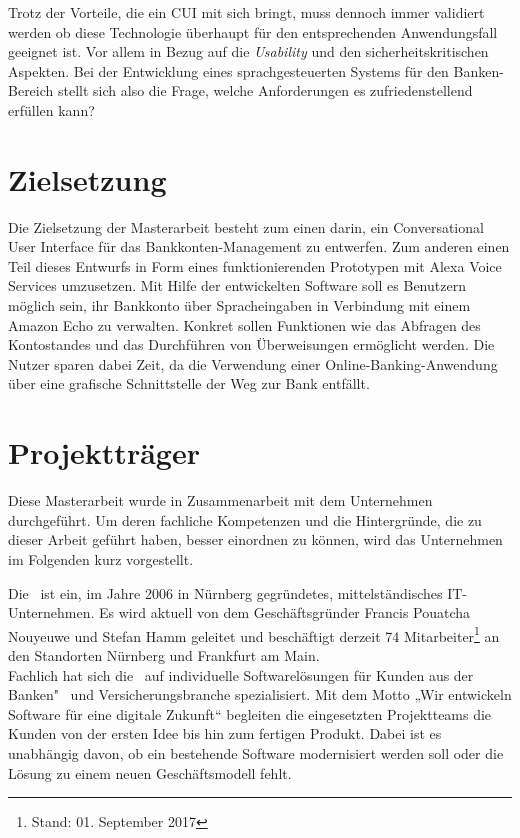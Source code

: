 Trotz der Vorteile, die ein \ac{CUI} mit sich bringt, muss dennoch immer validiert werden ob diese Technologie überhaupt für den entsprechenden Anwendungsfall geeignet ist. Vor allem in Bezug auf die \textit{Usability} \cite{richter-ux-compact} und den sicherheitskritischen Aspekten. Bei der Entwicklung eines sprachgesteuerten Systems für den Banken-Bereich stellt sich also die Frage, welche Anforderungen es zufriedenstellend erfüllen kann?

\section{Zielsetzung}
\label{sec:ziel-der-arbeit}

Die Zielsetzung der Masterarbeit besteht zum einen darin, ein Conversational User Interface für das Bankkonten-Management zu entwerfen. Zum anderen einen Teil dieses Entwurfs in Form eines funktionierenden Prototypen mit Alexa Voice Services umzusetzen. Mit Hilfe der entwickelten Software soll es Benutzern möglich sein, ihr Bankkonto über Spracheingaben in Verbindung mit einem Amazon Echo zu verwalten. Konkret sollen Funktionen wie das Abfragen des Kontostandes und das Durchführen von Überweisungen ermöglicht werden. Die Nutzer sparen dabei Zeit, da die Verwendung einer Online-Banking-Anwendung über eine grafische Schnittstelle \bzw der Weg zur Bank entfällt.

\section{Projektträger}
\label{sec:projekttraeger}

Diese Masterarbeit wurde in Zusammenarbeit mit dem Unternehmen \adorsys \, durchgeführt. Um deren fachliche Kompetenzen und die Hintergründe, die zu dieser Arbeit geführt haben, besser einordnen zu können, wird das Unternehmen im Folgenden kurz vorgestellt.

Die \adorsys \, ist ein, im Jahre 2006 in Nürnberg gegründetes, mittelständisches IT-Unternehmen. Es wird aktuell von dem Geschäftsgründer Francis Pouatcha Nouyeuwe und Stefan Hamm geleitet und beschäftigt derzeit 74 Mitarbeiter\footnote{Stand: 01. September 2017} an den Standorten Nürnberg und Frankfurt am Main. \\
Fachlich hat sich die \adorsys \, auf individuelle Softwarelösungen für Kunden aus der Banken"~ und Versicherungsbranche spezialisiert. Mit dem Motto „Wir entwickeln Software für eine digitale Zukunft“ begleiten die eingesetzten Projektteams die Kunden von der ersten Idee bis hin zum fertigen Produkt. Dabei ist es unabhängig davon, ob ein bestehende Software modernisiert werden soll oder die Lösung zu einem neuen Geschäftsmodell fehlt. 

